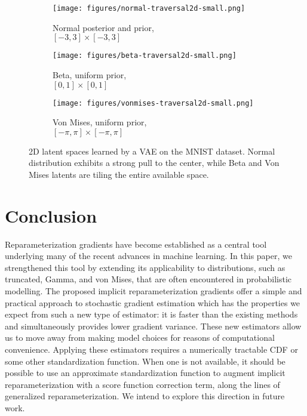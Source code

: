 \documentclass{article}
\begin{document}
\begin{figure}
    \centering
    \captionsetup{justification=centering}
    \begin{subfigure}[b]{0.27\linewidth}
        \centering
        \texttt{[image: figures/normal-traversal2d-small.png]}
        \caption{Normal posterior and prior, \\$[-3, 3] \times [-3, 3]$}
    \end{subfigure}\hfill
    \begin{subfigure}[b]{0.27\linewidth}
        \centering
        \texttt{[image: figures/beta-traversal2d-small.png]}
        \caption{Beta, uniform prior, \\$[0, 1] \times [0, 1]$}
    \end{subfigure}\hfill
    \begin{subfigure}[b]{0.27\linewidth}
        \centering
        \texttt{[image: figures/vonmises-traversal2d-small.png]}
        \caption{Von Mises, uniform prior, \\$[-\pi, \pi] \times [-\pi, \pi]$}
    \end{subfigure}
    \captionsetup{justification=justified}
    \caption{2D latent spaces learned by a VAE on the MNIST dataset. Normal distribution exhibits a strong pull to the center, while Beta and Von Mises latents are tiling the entire available space.}
    \label{fig:vae-mnist-latents}
\end{figure}
 
\section{Conclusion}
Reparameterization gradients have become established as a central tool underlying many of the recent advances in machine learning. In this paper, we strengthened this tool by extending its applicability to distributions, such as truncated, Gamma, and von Mises, that are often encountered in probabilistic modelling. The proposed implicit reparameterization gradients offer a simple and practical approach to stochastic gradient estimation which has the properties we expect from such a new type of estimator: it is faster than the existing methods and simultaneously provides lower gradient variance. These new estimators allow us to move away from making model choices for reasons of computational convenience. Applying these estimators requires a numerically tractable CDF or some other standardization function. When one is not available, it should be possible to use an approximate standardization function to augment implicit reparameterization with a score function correction term, along the lines of generalized reparameterization. We intend to explore this direction in future work.
\end{document}

